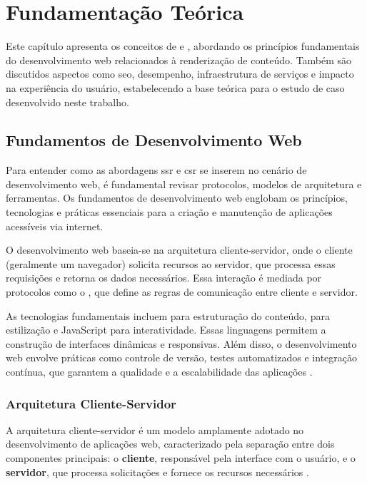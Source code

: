 \chapter{Fundamentação Teórica}
\label{cap:fundamentacao}

Este capítulo apresenta os conceitos de  e , abordando os princípios fundamentais do desenvolvimento web relacionados à renderização de conteúdo. Também são discutidos aspectos como \acrshort{seo}, desempenho, infraestrutura de serviços e impacto na experiência do usuário, estabelecendo a base teórica para o estudo de caso desenvolvido neste trabalho.

\section{Fundamentos de Desenvolvimento Web}
\label{sec:fundamentos-devweb}
Para entender como as abordagens \acrshort{ssr} e \acrshort{csr} se inserem no cenário de desenvolvimento web, é fundamental revisar protocolos, modelos de arquitetura e ferramentas.
Os fundamentos de desenvolvimento web englobam os princípios, tecnologias e práticas essenciais para a criação e manutenção de aplicações acessíveis via internet. 

O desenvolvimento web baseia-se na arquitetura cliente-servidor, onde o cliente (geralmente um navegador) solicita recursos ao servidor, que processa essas requisições e retorna os dados necessários. Essa interação é mediada por protocolos como o 
 , que define as regras de comunicação entre cliente e servidor.

As tecnologias fundamentais incluem  para estruturação do conteúdo,  para estilização e JavaScript para interatividade. Essas linguagens permitem a construção de interfaces dinâmicas e responsivas. Além disso, o desenvolvimento web envolve práticas como controle de versão, testes automatizados e integração contínua, que garantem a qualidade e a escalabilidade das aplicações \cite{fundamentosDevWeb}. 

\subsection{Arquitetura Cliente-Servidor}
\label{subsec:Arquitetura Cliente-Servidor}

A arquitetura cliente-servidor é um modelo amplamente adotado no desenvolvimento de aplicações web, caracterizado pela separação entre dois componentes principais: o \textbf{cliente}, responsável pela interface com o usuário, e o \textbf{servidor}, que processa solicitações e fornece os recursos necessários \cite{clienteServidorControlNet}.

